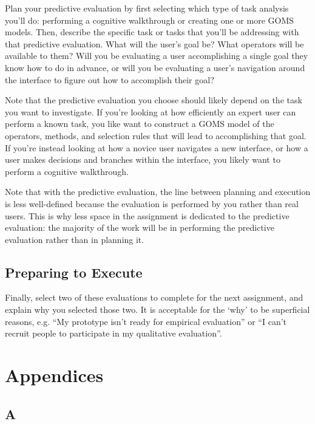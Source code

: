 \documentclass[12pt,letterpaper]{article}
\begin{document}
Plan your predictive evaluation by first selecting which type of task analysis you’ll do: performing a cognitive walkthrough or creating one or more GOMS models. Then, describe the specific task or tasks that you’ll be addressing with that predictive evaluation. What will the user’s goal be? What operators will be available to them? Will you be evaluating a user accomplishing a single goal they know how to do in advance, or will you be evaluating a user’s navigation around the interface to figure out how to accomplish their goal?

Note that the predictive evaluation you choose should likely depend on the task you want to investigate. If you’re looking at how efficiently an expert user can perform a known task, you like want to construct a GOMS model of the operators, methods, and selection rules that will lead to accomplishing that goal. If you’re instead looking at how a novice user navigates a new interface, or how a user makes decisions and branches within the interface, you likely want to perform a cognitive walkthrough.

Note that with the predictive evaluation, the line between planning and execution is less well-defined because the evaluation is performed by you rather than real users. This is why less space in the assignment is dedicated to the predictive evaluation: the majority of the work will be in performing the predictive evaluation rather than in planning it.

\subsection*{Preparing to Execute}

Finally, select two of these evaluations to complete for the next assignment, and explain why you selected those two. It is acceptable for the ‘why’ to be superficial reasons, e.g. “My prototype isn’t ready for empirical evaluation” or “I can’t recruit people to participate in my qualitative evaluation”.

 


\newpage
\section*{Appendices}

\appendix


\subsection*{A}
\end{document}

